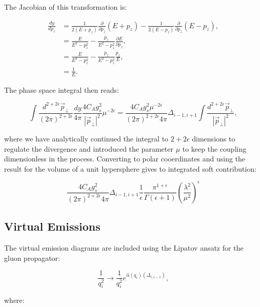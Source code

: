 			The Jacobian of this transformation is:

			\begin{align}
				\frac{dy}{dp_z} &= \frac{1}{2(E+p_z)} \frac{\partial}{\partial p_z}(E+p_z) - \frac{1}{2(E-p_z)}\frac{\partial}{\partial p_z}(E-p_z),\\
				&= \frac{E}{E^2-p_z^2} - \frac{p_z}{E^2-p_z^2}\frac{\partial E}{\partial p_z},\\
				&= \frac{E}{E^2-p_z^2} - \frac{p_z}{E^2-p_z^2}\frac{p_z}{E},\\
				&= \frac{1}{E}.
			\end{align}

			The phase space integral then reads:

			\begin{equation}
				\int\frac{d^{2+2\epsilon}\vec{p}_{\perp}}{(2\pi)^{2+2\epsilon}}\frac{dy}{4\pi}\frac{4C_Ag_s^2}
					{|\vec{p}_\perp|^2}\mu^{-2\epsilon} = \frac{4C_Ag_s^2\mu^{-2\epsilon}}{(2\pi)^{2+2\epsilon}4\pi}
					\Delta_{i-1, i+1}\int\frac{d^{2+2\epsilon}\vec{p}_{\perp}}{|\vec{p}_\perp|^2},
			\end{equation}

			where we have analytically continued the integral to $2+2\epsilon$ dimensions to regulate the
			divergence and introduced the parameter $\mu$ to keep the coupling dimensionless in the process.
			Converting to polar cooerdinates and using the result for the volume of a unit hypersphere gives
			to integrated soft contribution:

			\begin{equation}
				\frac{4C_Ag_s^2}{(2\pi)^{2+2\epsilon}4\pi}\Delta_{i-1, i+1}\frac{1}{\epsilon}\frac{\pi^{1+\epsilon}}
					{\Gamma(\epsilon+1)}\left(\frac{\lambda^2}{\mu^2}\right)^\epsilon
					\label{eqn:soft}
			\end{equation}

	\subsection{Virtual Emissions}
		\label{sub:subsection_name}

		The virtual emission diagrams are included using the Lipatov ansatz for the gluon propagator:

		\begin{equation}
			\frac{1}{q_i^2}\longrightarrow\frac{1}{q_i^2}e^{\hat{\alpha}(q_i)(\Delta_{i,i-1})},
		\end{equation}

		where:

